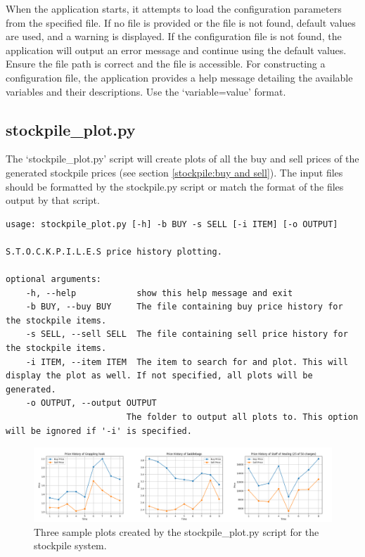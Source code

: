 When the application starts, it attempts to load the configuration parameters from the specified file. If no file is provided or the file is not found, default values are used, and a warning is displayed. If the configuration file is not found, the application will output an error message and continue using the default values. Ensure the file path is correct and the file is accessible. For constructing a configuration file, the application provides a help message detailing the available variables and their descriptions. Use the `variable=value' format.









\subsection{stockpile\_plot.py}

The `stockpile\_plot.py' script will create plots of all the buy and sell prices of the generated stockpile prices (see section \ref{stockpile:buy and sell}). The input files should be formatted by the stockpile.py script or match the format of the files output by that script.

\begin{lstlisting}
usage: stockpile_plot.py [-h] -b BUY -s SELL [-i ITEM] [-o OUTPUT]

S.T.O.C.K.P.I.L.E.S price history plotting.

optional arguments:
	-h, --help            show this help message and exit
	-b BUY, --buy BUY     The file containing buy price history for the stockpile items.
	-s SELL, --sell SELL  The file containing sell price history for the stockpile items.
	-i ITEM, --item ITEM  The item to search for and plot. This will display the plot as well. If not specified, all plots will be generated.
	-o OUTPUT, --output OUTPUT
	                    The folder to output all plots to. This option will be ignored if '-i' is specified.
\end{lstlisting}


\begin{figure}[h]
	\centering
	\includegraphics[width=\textwidth]{images/sample_plots.jpg}
	\caption{Three sample plots created by the stockpile\_plot.py script for the stockpile system.}
	\label{fig:sample_plots}
\end{figure}











